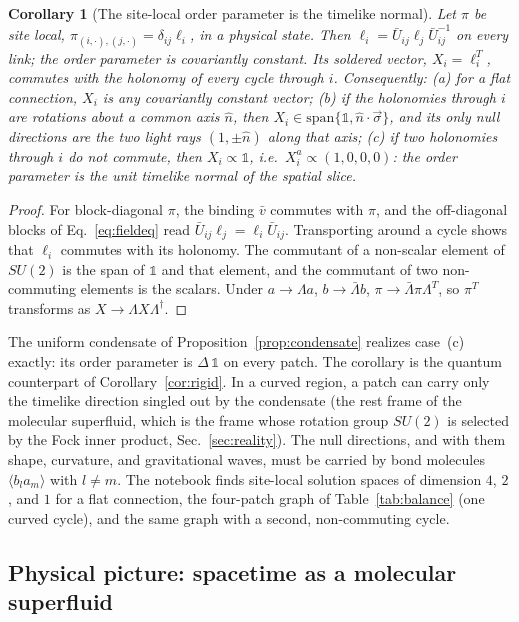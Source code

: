 \documentclass[reprint,aps,prd,amsmath,amssymb,superscriptaddress,nofootinbib,floatfix]{revtex4-2}
\theoremstyle{plain}
\newtheorem{corollary}{Corollary}
\theoremstyle{definition}
\theoremstyle{remark}
\newcommand{\Mol}{\ensuremath{X}}                 %
\newcommand{\one}{\mathbb{1}}
\newcommand{\SU}{SU(2)}
\begin{document}
\begin{corollary}[The site-local order parameter is the timelike normal]
\label{cor:sitelocal}
Let $\pi$ be site local, $\pi_{(i,\cdot),(j,\cdot)}=\delta_{ij}\ell_i$, in a physical state. Then $\ell_i=\bar U_{ij}\ell_j\bar U_{ij}^{-1}$ on every link;
the order parameter is covariantly constant. Its soldered vector, $\Mol_i=\ell_i^T$, commutes with the holonomy of every
cycle through $i$. Consequently: (a) for a flat connection, $\Mol_i$ is any covariantly constant vector; (b) if the holonomies
through $i$ are rotations about a common axis $\hat n$, then $\Mol_i\in\mathrm{span}\{\one,\hat n\cdot\vec\sigma\}$, and its only null
directions are the two light rays $(1,\pm\hat n)$ along that axis; (c) if two holonomies through $i$ do not commute, then
$\Mol_i\propto\one$, i.e.\ $\Mol^a_i\propto(1,0,0,0)$: the order parameter is the unit timelike normal of the spatial slice.
\end{corollary}
\begin{proof}
For block-diagonal $\pi$, the binding $\bar v$ commutes with $\pi$, and the off-diagonal blocks of Eq.~\eqref{eq:fieldeq} read
$\bar U_{ij}\ell_j=\ell_i\bar U_{ij}$. Transporting around a cycle shows that $\ell_i$ commutes with its holonomy. The commutant of a
non-scalar element of $\SU$ is the span of $\one$ and that element, and the commutant of two non-commuting elements
is the scalars. Under $a\to\Lambda a$, $b\to\bar\Lambda b$, $\pi\to\bar\Lambda\pi\Lambda^T$, so $\pi^T$ transforms as $\Mol\to\Lambda\Mol\Lambda^\dagger$.
\end{proof}
The uniform condensate of Proposition~\ref{prop:condensate} realizes case~(c) exactly: its order parameter is $\Delta\,\one$ on
every patch. The corollary is the quantum counterpart of Corollary~\ref{cor:rigid}. In a curved region, a patch can carry
only the timelike direction singled out by the condensate (the rest frame of the molecular superfluid, which is the
frame whose rotation group $\SU$ is selected by the Fock inner product, Sec.~\ref{sec:reality}). The null directions, and
with them shape, curvature, and gravitational waves, must be carried by bond molecules $\langle b_la_m\rangle$ with $l\neq m$.
The notebook finds site-local solution spaces of dimension $4$, $2$, and $1$ for a flat connection, the four-patch graph
of Table~\ref{tab:balance} (one curved cycle), and the same graph with a second, non-commuting cycle.

\subsection{Physical picture: spacetime as a molecular superfluid}
\label{sec:superfluid}
\end{document}
